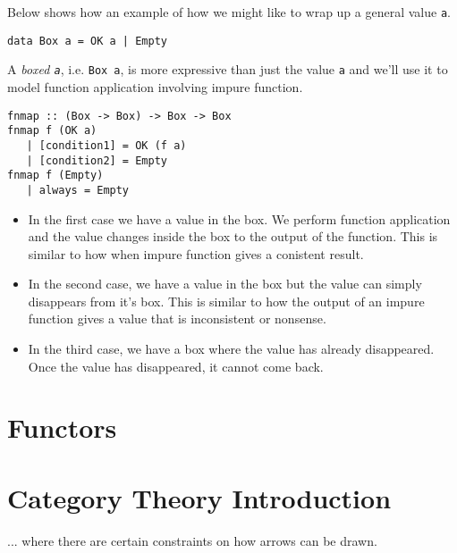 Below shows how an example of how we might like to wrap up a general value \lstinline{a}.
\begin{lstlisting}
data Box a = OK a | Empty
\end{lstlisting}

A \textit{boxed \lstinline{a}}, i.e. \lstinline{Box a}, is more 
expressive than just the value \lstinline{a} and we'll use it to model 
function application involving impure function.

\begin{lstlisting}
fnmap :: (Box -> Box) -> Box -> Box 
fnmap f (OK a) 
   | [condition1] = OK (f a)
   | [condition2] = Empty
fnmap f (Empty)
   | always = Empty
\end{lstlisting}


\begin{itemize}   
\renewcommand{\labelitemi}{$\Box$}
\item In the first case we have a value in the box.
We perform function application and the value changes inside the box to the output 
of the function. This is similar to how when impure function gives a conistent result.
\item In the second case,  we have a value in the box but
 the value can simply disappears from it's box. This is similar 
to how the output of an impure function gives a value that is inconsistent or nonsense. 
\item In the third case, we have a box where the value has 
already disappeared. Once the value has disappeared, it cannot come back. 
\end{itemize}







\section{Functors}



\section{Category Theory Introduction}


... where there are certain constraints on how arrows can be drawn.



